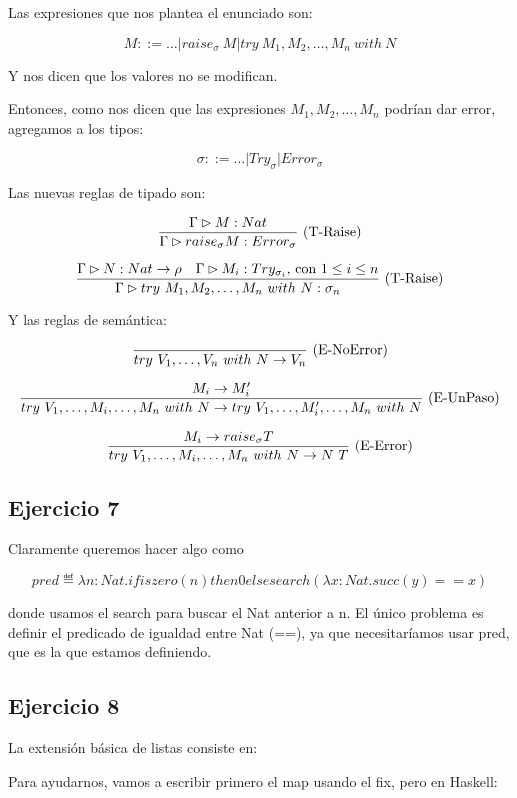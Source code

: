 Las expresiones que nos plantea el enunciado son:

\[M ::= \dots \vert raise_\sigma\ M \vert try\ M_1, M_2, \dots, M_n\ with\ N\]

Y nos dicen que los valores no se modifican.

Entonces, como nos dicen que las expresiones $M_1, M_2, \dots, M_n$ podrían dar error, agregamos a los tipos:

\[\sigma ::= \dots \vert Try_\sigma \vert Error_\sigma\]

Las nuevas reglas de tipado son:

\[\frac{\Gamma \rhd M : Nat}{\Gamma \rhd raise_\sigma M : Error_\sigma}\ \text{(T-Raise)}\]

\[\frac{\Gamma \rhd N : Nat \to \rho\quad \Gamma \rhd M_i : Try_{\sigma_i}\text{, con $1 \leq i \leq n$}}{\Gamma \rhd try\ M_1, M_2, \dots, M_n\ with\ N : \sigma_n}\ \text{(T-Raise)}\]

Y las reglas de semántica:

\[\frac{}{try\ V_1, \dots, V_n\ with\ N \to V_n}\ \text{(E-NoError)}\]

\[\deriv{M_i \to M_i'}{try\ V_1, \dots, M_i ,\dots, M_n\ with\ N \to try\ V_1, \dots, M_i' ,\dots, M_n\ with\ N}{E-UnPaso}\]

\[\frac{M_i \to raise_\sigma T}{try\ V_1, \dots, M_i ,\dots, M_n\ with\ N \to N\ T}\ \text{(E-Error)}\]


\subsection*{Ejercicio 7}

Claramente queremos hacer algo como

\[pred \eqdef \lambda n : Nat. if iszero(n) then 0 else search (\lambda x: Nat. succ(y) == x)\]

donde usamos el search para buscar el Nat anterior a n. El único problema es definir el predicado de igualdad entre Nat (==), ya que necesitaríamos usar pred, que es la que estamos definiendo.


\subsection*{Ejercicio 8} La extensión básica de listas consiste en:


Para ayudarnos, vamos a escribir primero el map usando el fix, pero en Haskell:

